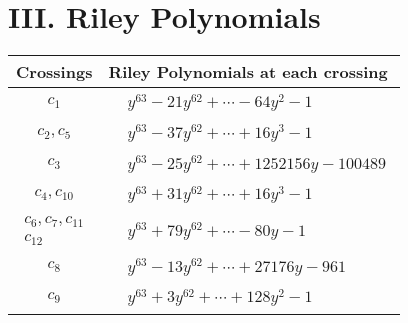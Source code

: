 \documentclass[1p]{elsarticle_modified}
\theoremstyle{definition}
\begin{document}
\centering \section*{ III. Riley Polynomials}
\begin{tabular}{m{50pt}|m{274pt}}
Crossings & \hspace{64pt}Riley Polynomials at each crossing \\
\hline $$\begin{aligned}c_{1}\end{aligned}$$&$\begin{aligned}
&y^{63}-21 y^{62}+\cdots-64 y^2-1
\end{aligned}$\\
\hline $$\begin{aligned}c_{2},c_{5}\end{aligned}$$&$\begin{aligned}
&y^{63}-37 y^{62}+\cdots+16 y^3-1
\end{aligned}$\\
\hline $$\begin{aligned}c_{3}\end{aligned}$$&$\begin{aligned}
&y^{63}-25 y^{62}+\cdots+1252156 y-100489
\end{aligned}$\\
\hline $$\begin{aligned}c_{4},c_{10}\end{aligned}$$&$\begin{aligned}
&y^{63}+31 y^{62}+\cdots+16 y^3-1
\end{aligned}$\\
\hline $$\begin{aligned}c_{6},c_{7},c_{11}\\c_{12}\end{aligned}$$&$\begin{aligned}
&y^{63}+79 y^{62}+\cdots-80 y-1
\end{aligned}$\\
\hline $$\begin{aligned}c_{8}\end{aligned}$$&$\begin{aligned}
&y^{63}-13 y^{62}+\cdots+27176 y-961
\end{aligned}$\\
\hline $$\begin{aligned}c_{9}\end{aligned}$$&$\begin{aligned}
&y^{63}+3 y^{62}+\cdots+128 y^2-1
\end{aligned}$\\
\hline
\end{tabular}
\vskip 2pc
\end{document}
